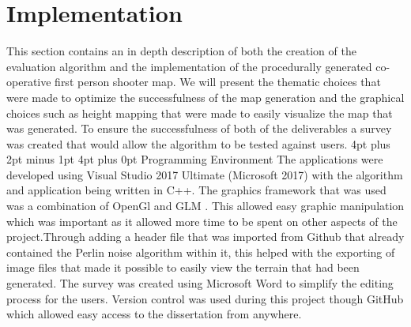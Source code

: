 \documentclass[12pt,a4paper,oneside]{book}
\makeatletter
\renewcommand\section{\@startsection {section}{1}{0mm} %
                               {4pt plus 2pt minus 1pt} %
                               {4pt plus 0pt} %
                               {\bfseries}}
\makeatother
\begin{document}
\chapter{Implementation}
This section contains an in depth description of both the creation of the evaluation algorithm and the implementation of the procedurally generated co-operative first person shooter map. We will present the thematic choices that were made to optimize the successfulness of the map generation and the graphical choices such as height mapping that were made to easily visualize the map that was generated. To ensure the successfulness of both of the deliverables a survey was created that would allow the algorithm to be tested against users.
\vspace{5mm} 
\newline
\section{Programming Environment}
The applications were developed using Visual Studio 2017 Ultimate (Microsoft
2017) with the algorithm and application being written in C++. The graphics framework that was used was a combination of OpenGl and GLM \cite{OpenGL}. This allowed easy graphic manipulation which was important as it allowed more time to be spent on other aspects of the project.Through adding a header file that was imported from Github that already contained the Perlin noise algorithm within it, this helped with the exporting of image files that made it possible to easily view the terrain that had been generated. The survey was created using Microsoft Word to simplify the editing process for the users.  Version control was used during this project though GitHub which allowed easy access to the dissertation from anywhere.
\vspace{5mm} 
\newline
\end{document}
